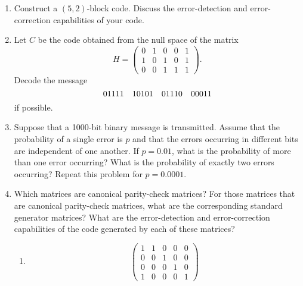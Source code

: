 {\begin{enumerate}
\begin{multicols}{2}
\begin{enumerate}
\item
\[
\begin{pmatrix}
1 & 0 & 0 & 1 & 1 \\
0 & 1 & 0 & 1 & 1
\end{pmatrix}
\]

\item
\[
\begin{pmatrix}
0 & 0 & 0 & 1 & 1 & 1 & 1 \\
0 & 1 & 1 & 0 & 0 & 1 & 1 \\
1 & 0 & 1 & 0 & 1 & 0 & 1 \\
0 & 1 & 1 & 0 & 0 & 1 & 1
\end{pmatrix}
\]


\end{enumerate}
\end{multicols}

 
\item %
Construct a $(5,2)$-block code. Discuss the error-detection and
error-correction capabilities of your code.
 
 
\item
Let $C$ be the code obtained from the null space of the matrix
\[
H =
\begin{pmatrix}
0 & 1 & 0 & 0 & 1 \\
1 & 0 & 1 & 0 & 1 \\
0 & 0 & 1 & 1 & 1
\end{pmatrix}.
\]
Decode the message
\[
01111 \quad 10101 \quad 01110 \quad 00011  \\
\]
if possible.
 
 
\item
Suppose that a 1000-bit binary message is transmitted. Assume that the
probability of a single error is $p$ and that the errors occurring in
different bits are independent of one another. If $p = 0.01$, what is
the probability of more than one error occurring? What is the
probability of exactly two errors occurring?  Repeat this problem for
$p = 0.0001$.
 
 
 \item
Which matrices are canonical parity-check matrices? For those matrices
that are canonical parity-check matrices, what are the corresponding
standard generator matrices? What are the error-detection and
error-correction capabilities of the code generated by each of these
matrices? 
\begin{multicols}{2}
\begin{enumerate}

\item
\[
\begin{pmatrix}
1 & 1 & 0 & 0 & 0 \\
0 & 0 & 1 & 0 & 0 \\
0 & 0 & 0 & 1 & 0 \\
1 & 0 & 0 & 0 & 1
\end{pmatrix}
\]


\end{enumerate}
\end{multicols}
\end{enumerate}}
